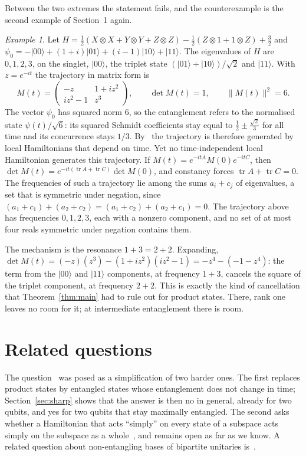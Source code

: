 \documentclass[11pt]{article}
\theoremstyle{remark}
\newtheorem*{example}{Example}
\begin{document}
Between the two extremes the statement fails, and the counterexample is the second example of
Section~1 again.

\begin{example}
Let $H=\tfrac12(X\otimes X+Y\otimes Y+Z\otimes Z)-\tfrac12(Z\otimes1+1\otimes Z)+\tfrac32$ and
$\psi_0=-\lvert00\rangle+(1+i)\lvert01\rangle+(i-1)\lvert10\rangle+\lvert11\rangle$. The
eigenvalues of $H$ are $0,1,2,3$, on the singlet, $\lvert00\rangle$, the triplet state
$(\lvert01\rangle+\lvert10\rangle)/\sqrt2$ and $\lvert11\rangle$. With $z=e^{-it}$ the
trajectory in matrix form is
\[
M(t)=\begin{pmatrix}-z&1+iz^2\\ iz^2-1&z^3\end{pmatrix},\qquad \det M(t)=1,\qquad
\lVert M(t)\rVert^2=6 .
\]
The vector $\psi_0$ has squared norm $6$, so the entanglement refers to the normalised state
$\psi(t)/\sqrt6$: its squared Schmidt coefficients stay equal to $\tfrac12\pm\tfrac{\sqrt2}{3}$ for
all time and its concurrence stays $1/3$. By~\cite{MCMNN16} the trajectory is therefore
generated by local Hamiltonians that depend on time. Yet no time-independent local Hamiltonian generates this
trajectory. If $M(t)=e^{-itA}M(0)e^{-itC}$, then $\det M(t)=e^{-it(\operatorname{tr}A+
\operatorname{tr}C)}\det M(0)$, and constancy forces $\operatorname{tr}A+\operatorname{tr}C=0$.
The frequencies of such a trajectory lie among the sums $a_i+c_j$ of eigenvalues, a set that
is symmetric under negation, since $(a_1+c_1)+(a_2+c_2)=(a_1+c_2)+(a_2+c_1)=0$. The trajectory
above has frequencies $0,1,2,3$, each with a nonzero component, and no set of at most four
reals symmetric under negation contains them.
\end{example}

The mechanism is the resonance $1+3=2+2$. Expanding, $\det M(t)=(-z)(z^3)-(1+iz^2)(iz^2-1)
=-z^4-(-1-z^4)$: the term from the $\lvert00\rangle$ and $\lvert11\rangle$ components, at
frequency $1+3$, cancels the square of the triplet component, at frequency $2+2$. This is
exactly the kind of cancellation that Theorem~\ref{thm:main} had to rule out for product
states. There, rank one leaves no room for it; at intermediate entanglement there is room.

\section{Related questions}

The question~\cite{SE816017} was posed as a simplification of two harder ones. The first
replaces product states by entangled states whose entanglement does not change in time;
Section~\ref{sec:sharp} shows that the answer is then no in general, already for two qubits,
and yes for two qubits that stay maximally entangled. The second asks whether a Hamiltonian
that acts ``simply'' on every state of a subspace acts simply on the subspace as a
whole~\cite{SE797030}, and remains open as far as we know. A related question about
non-entangling bases of bipartite unitaries is~\cite{SE602903}.
\end{document}

